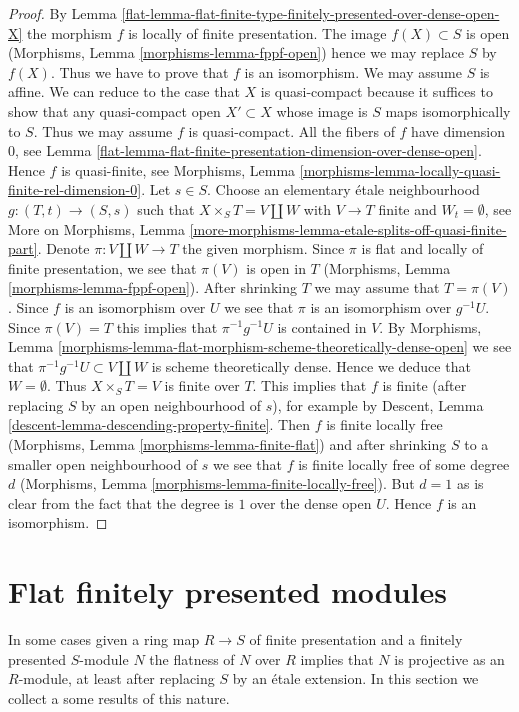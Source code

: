 \begin{proof}

By Lemma \ref{flat-lemma-flat-finite-type-finitely-presented-over-dense-open-X}
the morphism $f$ is locally of finite presentation.
The image $f(X) \subset S$ is open
(Morphisms, Lemma \ref{morphisms-lemma-fppf-open})
hence we may replace $S$ by $f(X)$. Thus we have to prove that
$f$ is an isomorphism. We may assume $S$ is affine. We can reduce
to the case that $X$ is quasi-compact because it suffices to show
that any quasi-compact open $X' \subset X$ whose image is $S$
maps isomorphically to $S$. Thus we may assume $f$ is quasi-compact.
All the fibers of $f$ have dimension $0$, see
Lemma \ref{flat-lemma-flat-finite-presentation-dimension-over-dense-open}.
Hence $f$ is quasi-finite, see
Morphisms, Lemma \ref{morphisms-lemma-locally-quasi-finite-rel-dimension-0}.
Let $s \in S$. Choose an elementary \'etale
neighbourhood $g : (T, t) \to (S, s)$ such that $X \times_S T = V \amalg W$
with $V \to T$ finite and $W_t = \emptyset$, see
More on Morphisms, Lemma
\ref{more-morphisms-lemma-etale-splits-off-quasi-finite-part}.
Denote $\pi : V \amalg W \to T$ the given morphism. Since $\pi$ is
flat and locally of finite presentation, we see that $\pi(V)$ is
open in $T$ (Morphisms, Lemma \ref{morphisms-lemma-fppf-open}).
After shrinking $T$ we may assume that $T = \pi(V)$.
Since $f$ is an isomorphism over $U$ we see that $\pi$ is an
isomorphism over $g^{-1}U$. Since $\pi(V) = T$ this implies
that $\pi^{-1}g^{-1}U$ is contained in $V$.
By Morphisms, Lemma
\ref{morphisms-lemma-flat-morphism-scheme-theoretically-dense-open}
we see that $\pi^{-1}g^{-1}U \subset V \amalg W$ is scheme theoretically
dense. Hence we deduce that $W = \emptyset$.
Thus $X \times_S T = V$ is finite over $T$.
This implies that $f$ is finite (after replacing $S$ by an
open neighbourhood of $s$), for example by
Descent, Lemma \ref{descent-lemma-descending-property-finite}.
Then $f$ is finite locally free
(Morphisms, Lemma \ref{morphisms-lemma-finite-flat})
and after shrinking $S$ to a smaller open neighbourhood of $s$
we see that $f$ is finite locally free of some degree $d$
(Morphisms, Lemma \ref{morphisms-lemma-finite-locally-free}).
But $d = 1$ as is clear from the fact that the degree is $1$ over
the dense open $U$. Hence $f$ is an isomorphism.
\end{proof}

\section{Flat finitely presented modules}
\label{flat-section-finitely-presented-flat}
In some cases given a ring map $R \to S$ of finite presentation and
a finitely presented $S$-module $N$ the flatness of $N$ over $R$ implies
that $N$ is projective as an $R$-module, at least after replacing $S$
by an \'etale extension. In this section we collect a some results
of this nature.


